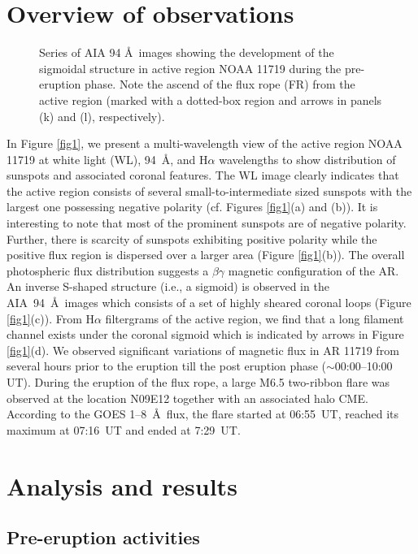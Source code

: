 \documentclass[twocolumn]{aastex6}
\begin{document}
\section{Overview of observations}
\label{sec_obs}

\begin{figure*}
\caption{Series of AIA 94 \AA~images showing the development of the sigmoidal structure in active region NOAA 11719 during the pre-eruption phase. Note the ascend of the flux rope (FR) from the active region (marked with a dotted-box region and arrows in panels (k) and (l), respectively).}
\label{Sigmoid_evolution}
\end{figure*}

In Figure \ref{fig1}, we present a multi-wavelength view of the active region NOAA 11719 at white light (WL), 94~\AA, and H$ \alpha $ wavelengths to show distribution of sunspots and associated coronal features. The WL image clearly indicates that the active region consists of several small-to-intermediate sized sunspots with the largest one possessing negative polarity (cf. Figures \ref{fig1}(a) and (b)). It is interesting to note that most of the prominent sunspots are of negative polarity. Further, there is scarcity of sunspots exhibiting positive polarity while the positive flux region is dispersed over a larger area (Figure \ref{fig1}(b)). The overall photospheric flux distribution suggests a $ \beta \gamma $ magnetic configuration of the AR. An inverse S-shaped structure (i.e., a sigmoid) is observed in the AIA~94~\AA~images which consists of a set of highly sheared coronal loops (Figure \ref{fig1}(c)). From H$ \alpha $ filtergrams of the active region, we find that a long filament channel exists under the coronal sigmoid which is indicated by arrows in Figure \ref{fig1}(d). We observed significant variations of magnetic flux in AR 11719 from several hours prior to the eruption till the post eruption phase ($ \sim $00:00--10:00 UT). During the eruption of the flux rope, a large M6.5 two-ribbon flare was observed at the location N09E12 together with an associated halo CME. According to the GOES 1--8~\AA~flux, the flare started at 06:55~UT, reached its maximum at 07:16~UT and ended at 7:29~UT. 

\section{Analysis and results}
\label{sec_analysis}
\subsection{Pre-eruption activities}
\end{document}
